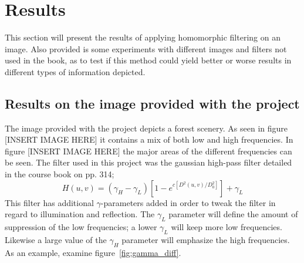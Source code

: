 %


\section{Results}
	This section will present the results of applying homomorphic filtering
	on an image. Also provided is some experiments with different images
	and filters not used in the book, as to test if this method could yield
	better or worse results in different types of information depicted.
	\subsection{Results on the image provided with the project}
		The image provided with the project depicts a forest scenery. %
		As seen in figure [INSERT IMAGE HERE] it contains a mix of both low 
		and high frequencies. In figure [INSERT IMAGE HERE] the major areas of 
		the different frequencies can be seen. The filter used in this project was
		the gaussian high-pass filter detailed in the course book on pp. 314; 
		\begin{equation}
		\label{eqn:gaussian_filter}
			H(u,v) = \left( \gamma_H - \gamma_L \right) \left[ 1 - e^{c \left[D^2(u,v)/D_0^2\right]}\right] + \gamma_L 
		\end{equation}
		This filter has additional $\gamma$-parameters added in order to tweak
		the filter in regard to illumination and reflection. The $\gamma_L$ parameter
		will define the amount of suppression of the low frequencies; a lower $\gamma_L$
		will keep more low frequencies. Likewise a large value of the $\gamma_H$ parameter 
		will emphasize the high frequencies. As an example, examine figure~\ref{fig:gamma_diff}.
